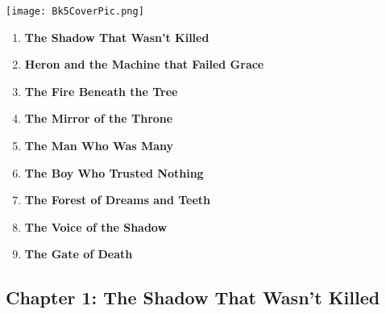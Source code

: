 \documentclass[12pt]{article}
\begin{document}
\vspace{1em}

\begin{center}
    \texttt{[image: Bk5CoverPic.png]}
\end{center}

\vspace{1em}

\begin{enumerate}
    \item \textbf{The Shadow That Wasn’t Killed} 

    \vspace{1pt}

    \item \textbf{Heron and the Machine that Failed Grace} 

    \vspace{1pt}

    \item \textbf{The Fire Beneath the Tree} 

    \vspace{1pt}

    \item \textbf{The Mirror of the Throne} 

    \vspace{1pt}

    \item \textbf{The Man Who Was Many} 

    \vspace{1pt}

    \item \textbf{The Boy Who Trusted Nothing}

    \vspace{1pt}

    \item \textbf{The Forest of Dreams and Teeth} 

    \vspace{1pt}

    \item \textbf{The Voice of the Shadow}

    \vspace{1pt}

    \item \textbf{The Gate of Death}

\end{enumerate}

\newpage

\subsection*{Chapter 1: The Shadow That Wasn’t Killed}
\end{document}
